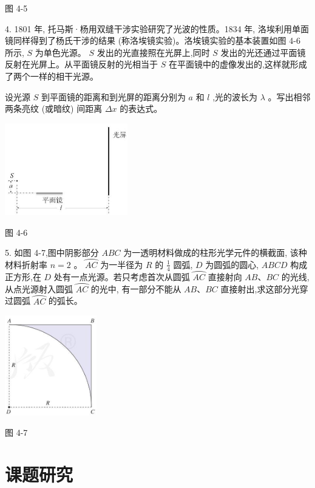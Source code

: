 \documentclass[10pt]{article}
\begin{document}
图 4-5

4. 1801 年, 托马斯·杨用双缝干涉实验研究了光波的性质。1834 年, 洛埃利用单面镜同样得到了杨氏干涉的结果 (称洛埃镜实验)。洛埃镜实验的基本装置如图 4-6 所示, \(S\) 为单色光源。 \(S\) 发出的光直接照在光屏上,同时 \(S\) 发出的光还通过平面镜反射在光屏上。从平面镜反射的光相当于 \(S\) 在平面镜中的虚像发出的,这样就形成了两个一样的相干光源。

设光源 \(S\) 到平面镜的距离和到光屏的距离分别为 \(a\) 和 \(l\) ,光的波长为 \(\lambda\) 。写出相邻两条亮纹 (或暗纹) 间距离 \({\Delta x}\) 的表达式。

\begin{center}
\includegraphics[max width=0.4\textwidth]{images/01910e4c-ebb8-7d2c-8f2f-2375bc1d2d12_120_201401.jpg}
\end{center}

图 4-6

5. 如图 4-7,图中阴影部分 \({ABC}\) 为一透明材料做成的柱形光学元件的横截面, 该种材料折射率 \(n = 2\) 。 \(\overset{⏜}{AC}\) 为一半径为 \(R\) 的 \(\frac{1}{4}\) 圆弧, \(D\) 为圆弧的圆心, \({ABCD}\) 构成正方形,在 \(D\) 处有一点光源。若只考虑首次从圆弧 \(\overset{⏜}{AC}\) 直接射向 \({AB}\text{、}{BC}\) 的光线,从点光源射入圆弧 \(\overset{⏜}{AC}\) 的光中, 有一部分不能从 \({AB}\text{、}{BC}\) 直接射出,求这部分光穿过圆弧 \(\overset{⏜}{AC}\) 的弧长。

\begin{center}
\includegraphics[max width=0.3\textwidth]{images/01910e4c-ebb8-7d2c-8f2f-2375bc1d2d12_120_783303.jpg}
\end{center}

图 4-7

\section*{课题研究}
\end{document}
